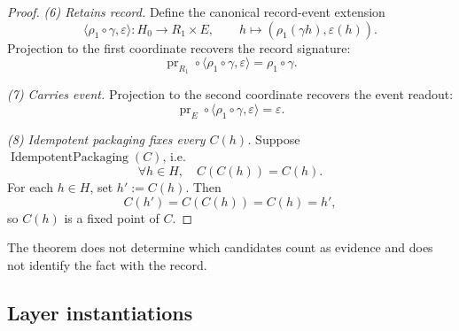 \documentclass[11pt]{article}
\theoremstyle{definition}
\begin{document}
\begin{proof}
\emph{(6) Retains record.}
Define the canonical record-event extension
\[
  \langle\rho_1\circ\gamma,\varepsilon\rangle:
  H_0\longrightarrow R_1\times E,
  \qquad
  h\longmapsto(\rho_1(\gamma h),\varepsilon(h)).
\]
Projection to the first coordinate recovers the record signature:
\[
  \operatorname{pr}_{R_1}
  \circ\langle\rho_1\circ\gamma,\varepsilon\rangle
  =
  \rho_1\circ\gamma.
\]

\emph{(7) Carries event.}
Projection to the second coordinate recovers the event readout:
\[
  \operatorname{pr}_{E}
  \circ\langle\rho_1\circ\gamma,\varepsilon\rangle
  =
  \varepsilon.
\]

\emph{(8) Idempotent packaging fixes every \(C(h)\).}
Suppose \(\operatorname{IdempotentPackaging}(C)\), i.e.
\[
  \forall h\in H,\quad C(C(h))=C(h).
\]
For each \(h\in H\), set \(h':=C(h)\).  Then
\[
  C(h')=C(C(h))=C(h)=h',
\]
so \(C(h)\) is a fixed point of \(C\).
\end{proof}

The theorem does not determine which candidates count as evidence and
does not identify the fact with the record.

\subsection*{Layer instantiations}\label{layer-inst:F20}
\end{document}
